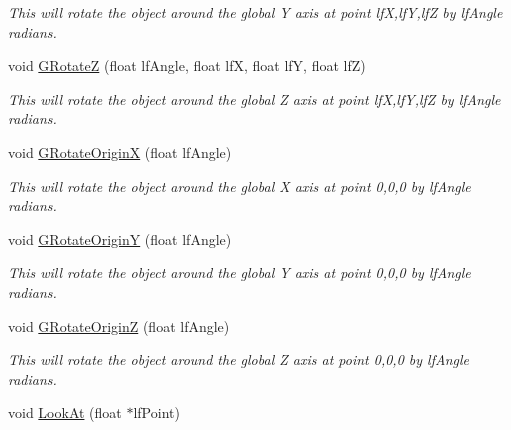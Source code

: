 \begin{DoxyCompactItemize}
\begin{DoxyCompactList}\small\item\em This will rotate the object around the global Y axis at point lfX,lfY,lfZ by lfAngle radians. \end{DoxyCompactList}\item 
\hypertarget{classc_matrix4_a5b357f5686b74e0feeff7eaae070f566}{
void \hyperlink{classc_matrix4_a5b357f5686b74e0feeff7eaae070f566}{GRotateZ} (float lfAngle, float lfX, float lfY, float lfZ)}
\label{classc_matrix4_a5b357f5686b74e0feeff7eaae070f566}

\begin{DoxyCompactList}\small\item\em This will rotate the object around the global Z axis at point lfX,lfY,lfZ by lfAngle radians. \end{DoxyCompactList}\item 
\hypertarget{classc_matrix4_a3ddcb503ea46911e194a9b881a6f0bee}{
void \hyperlink{classc_matrix4_a3ddcb503ea46911e194a9b881a6f0bee}{GRotateOriginX} (float lfAngle)}
\label{classc_matrix4_a3ddcb503ea46911e194a9b881a6f0bee}

\begin{DoxyCompactList}\small\item\em This will rotate the object around the global X axis at point 0,0,0 by lfAngle radians. \end{DoxyCompactList}\item 
\hypertarget{classc_matrix4_abe68a204b91201b33adc32f5b354631e}{
void \hyperlink{classc_matrix4_abe68a204b91201b33adc32f5b354631e}{GRotateOriginY} (float lfAngle)}
\label{classc_matrix4_abe68a204b91201b33adc32f5b354631e}

\begin{DoxyCompactList}\small\item\em This will rotate the object around the global Y axis at point 0,0,0 by lfAngle radians. \end{DoxyCompactList}\item 
\hypertarget{classc_matrix4_af5ecfcfab719acf23ddb1148ad24825a}{
void \hyperlink{classc_matrix4_af5ecfcfab719acf23ddb1148ad24825a}{GRotateOriginZ} (float lfAngle)}
\label{classc_matrix4_af5ecfcfab719acf23ddb1148ad24825a}

\begin{DoxyCompactList}\small\item\em This will rotate the object around the global Z axis at point 0,0,0 by lfAngle radians. \end{DoxyCompactList}\item 
\hypertarget{classc_matrix4_a0982225c44091485ea386d9cd6cae3f0}{
void \hyperlink{classc_matrix4_a0982225c44091485ea386d9cd6cae3f0}{LookAt} (float $\ast$lfPoint)}
\label{classc_matrix4_a0982225c44091485ea386d9cd6cae3f0}


\end{DoxyCompactItemize}
